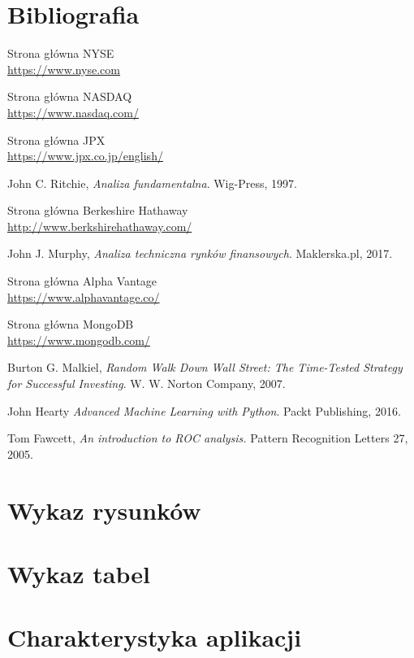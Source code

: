 \documentclass[a4paper, twoside, 11pt, openright]{article}
\begin{document}
\section{Bibliografia}
\begin{thebibliography}{9}
  
Strona główna NYSE
\\\url{https://www.nyse.com}
 
Strona główna NASDAQ
\\\url{https://www.nasdaq.com/}

Strona główna JPX
\\\url{https://www.jpx.co.jp/english/}

  John C. Ritchie,
  \textit{Analiza fundamentalna}.
  Wig-Press,
  1997.
  
Strona główna Berkeshire Hathaway
\\\url{http://www.berkshirehathaway.com/}

  John J. Murphy,
  \textit{Analiza techniczna rynków finansowych}.
  Maklerska.pl,
  2017.

Strona główna Alpha Vantage
\\\url{https://www.alphavantage.co/}

Strona główna MongoDB
\\\url{https://www.mongodb.com/}



  Burton G. Malkiel,
  \textit{Random Walk Down Wall Street: The Time-Tested Strategy for Successful Investing}.
  W. W. Norton Company,
  2007.


  John Hearty
  \textit{Advanced Machine Learning with Python}.
  Packt Publishing,
  2016.

	Tom Fawcett, 
  \textit{An introduction to ROC analysis.}
  Pattern Recognition Letters 27,
  2005.



\end{thebibliography}

\newpage

\section{Wykaz rysunków}

\newpage

\section{Wykaz tabel}

\newpage

\section{Charakterystyka aplikacji}
\end{document}
